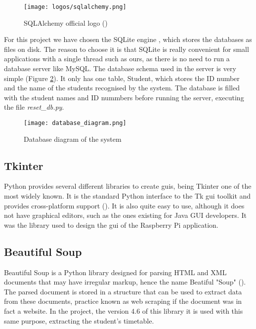 	\begin{figure}[!ht]
		\centering
		\texttt{[image: logos/sqlalchemy.png]}
		\caption{SQLAlchemy official logo (\cite{sqlalchemy_main_website})}
		\label{fig:sqlalchemy}
	\end{figure}

	For this project we have chosen the SQLite engine , which stores the databases as files on disk. The reason to choose it is that SQLite is really convenient for small applications with a single thread such as ours, as there is no need to run a database server like MySQL. The database schema used in the server is very simple (Figure \ref{fig:database_diagram}). It only has one table, Student, which stores the ID number and the name of the students recognised by the system. The database is filled with the student names and ID nummbers before running the server, executing the file \textit{reset{\_}db.py}.

	\begin{figure}[!ht]
		\centering
		\texttt{[image: database\_diagram.png]}
		\caption{Database diagram of the system}
		\label{fig:database_diagram}
	\end{figure}

	\subsection{Tkinter} 
	Python provides several different libraries to create \glspl{gui}, being Tkinter one of the most widely known. It is the standard Python interface to the Tk \gls{gui} toolkit and provides cross-platform support (\cite{tkinter_docs}). It is also quite easy to use, although it does not have graphical editors, such as the ones existing for Java GUI developers. It was the library used to design the \gls{gui} of the Raspberry Pi application.  

	\subsection{Beautiful Soup}
	Beautiful Soup is a Python library designed for parsing HTML and XML documents that may have irregular markup, hence the name Beatiful "Soup" (\cite{beautiful_soup_main}). The parsed document is stored in a structure that can be used to extract data from these documents, practice known as web scraping if the document was in fact a website. In the project, the version 4.6 of this library it is used with this same purpose, extracting the student's timetable. 	

